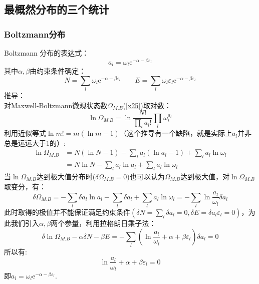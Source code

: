 \documentclass[12pt]{article}
\begin{document}
\subsection{最概然分布的三个统计}
	\subsubsection{Boltzmann分布}
\noindent
Boltzmann 分布的表达式：
\begin{equation}
		a_l=\omega_l \mathrm{e}^{-\alpha-\beta \varepsilon_l}
\end{equation}
其中$\alpha, \beta$由约束条件确定：
\begin{equation}
	N=\sum_{l}\omega_l \mathrm{e}^{-\alpha-\beta \varepsilon_l}\quad\quad E=\sum_{l}\omega_l\varepsilon_l \mathrm{e}^{-\alpha-\beta \varepsilon_l}
\end{equation}
推导：\\
对Maxwell-Boltzmann微观状态数$\Omega_{M.B}$(\ref{x25})取对数：
\begin{equation}
	\ln \Omega_{M.B}=\ln \frac{N!}{\prod_{l} a_l!}\prod_{l}\omega_l^{a_l}
\end{equation}
利用近似等式$\ln m!=m(\ln m-1)$（这个推导有一个缺陷，就是实际上$a_l$并非总是远远大于1的）:
\begin{equation}
	\begin{split}
	\ln \Omega_{M.B}&=N(\ln N-1)-\sum_{l}  a_l(\ln a_l-1)+\sum_l a_l\ln \omega_l\\
	&=N\ln N-\sum_{l}a_l\ln a_l+\sum_{l}a_l\ln \omega_l
	\end{split}
	\label{x31}
\end{equation}
当$\ln \Omega_{M.B}$达到极大值分布时($\delta \Omega_{M.B}=0$)也可以认为$\Omega_{M.B}$达到极大值，对$\ln \Omega_{M.B}$取变分，有：
\begin{equation}
	\delta \Omega_{M.B}=-\sum_{l} \delta a_l \ln a_l-\sum_{l} \delta a_l +\sum_{l}a_l\ln \omega_l=-\sum_{l} \ln \frac{a_l}{\omega_l}\delta a_l
\end{equation}
此时取得的极值并不能保证满足约束条件$(\delta N=\sum_{l}\delta a_l =0, \delta E=\delta a_l \varepsilon_l=0)$，为此我们引入$\alpha,\beta$两个参量，利用拉格朗日乘子法：
\begin{equation}
	\delta \ln \Omega_{M.B}-\alpha \delta N-\beta E=-\sum_{l}(\ln \frac{a_l}{\omega_l}+\alpha+\beta \varepsilon_l)\delta a_l=0
\end{equation}
所以有:
\begin{equation}
	\ln \frac{a_l}{\omega_l}+\alpha+\beta \varepsilon_l=0
	\label{x30}
\end{equation}
即$a_l=\omega_l\mathrm{e}^{-\alpha-\beta \varepsilon_l}$.
\end{document}
